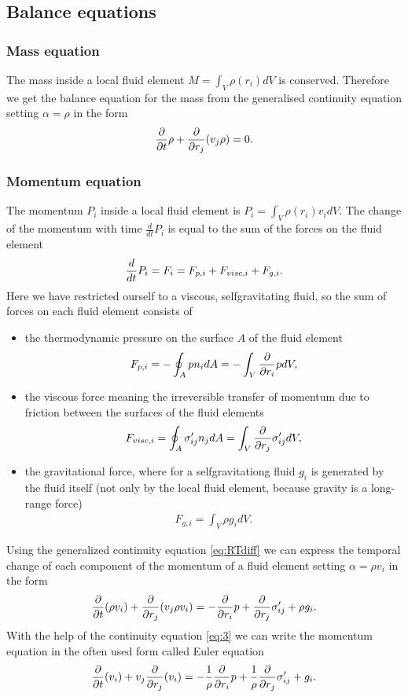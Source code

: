 \subsection{Balance equations}
\subsubsection{Mass equation}
The mass inside a local fluid element $M=\int_V \rho(r_i) dV$ is conserved.
Therefore we get the balance equation for the mass from the generalised 
continuity equation setting $\alpha=\rho$ in the form
\begin{align}
\frac{\partial}{\partial t}\rho + \frac{\partial}{\partial r_j}(v_j \rho) = 0. \label{eq:3}
\end{align}
\subsubsection{Momentum equation}
The momentum $P_i$ inside a local fluid element is $P_i=\int_V \rho(r_i) v_i
dV$. The change of the momentum with time $\frac{d}{dt} P_i$ is equal to the sum
of the forces on the fluid element
\begin{align}
\frac{d}{d t} P_i=F_i=F_{p,i}+F_{visc,i}+F_{g,i}.
\end{align}
Here we have restricted ourself to a viscous, selfgravitating fluid, so the sum 
of forces on each fluid element consists of 
\begin{itemize}
\item the thermodynamic pressure on the surface $A$ of the fluid element
\begin{align}
F_{p,i}= - \oint_A p n_i dA = - \int_V \frac{\partial}{\partial r_i} p dV,
\end{align}
\item the viscous force meaning the irreversible transfer of momentum due to
friction between the surfaces of the fluid elements 
\begin{align}
F_{visc,i}= \oint_A \sigma'_{ij} n_j dA = \int_V \frac{\partial}{\partial r_j} \sigma'_{ij} dV,
\end{align}
\item the gravitational force, where for a selfgravitationg fluid $g_i$ is 
generated by the fluid itself (not only by the local fluid element, because
gravity is a long-range force)
\begin{align}
F_{g,i}= \int_V \rho g_i dV.
\end{align}
\end{itemize}
Using the generalized continuity equation \eqref{eq:RTdiff} we can express the
temporal change of each component of the momentum of a fluid element
setting $\alpha=\rho v_i$ in the form
\begin{align}
\frac{\partial}{\partial t}(\rho v_i) + \frac{\partial}{\partial r_j}(v_j \rho v_i) = -\frac{\partial}{\partial r_i}p + \frac{\partial}{\partial r_j}\sigma'_{ij}
+\rho g_i.
\end{align}
With the help of the continuity equation \eqref{eq:3} we can write the momentum
equation in the often used form called Euler equation
\begin{align}
\frac{\partial}{\partial t}(v_i) + v_j \frac{\partial}{\partial r_j}( v_i) = -\frac{1}{\rho}\frac{\partial}{\partial r_i}p +
\frac{1}{\rho}\frac{\partial}{\partial r_j}\sigma'_{ij} + g_i. \label{eq:vel}
\end{align}

